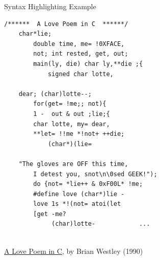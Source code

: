 \documentclass[10pt, xcolor={table}]{beamer}
\begin{document}
\begin{frame}[fragile]{Syntax Highlighting Example }
    \begin{center}
    \begin{minipage}[t]{0.5\textwidth}
    \begin{lstlisting}[basicstyle=\tiny]
    /******  A Love Poem in C  ******/
    char*lie;
        double time, me= !0XFACE,
        not; int rested, get, out;
        main(ly, die) char ly,**die ;{
            signed char lotte,
    
    dear; (char)lotte--;
        for(get= !me;; not){
        1 -  out & out ;lie;{
        char lotte, my= dear,
        **let= !!me *!not+ ++die;
            (char*)(lie=
        
    "The gloves are OFF this time,   
        I detest you, snot\n\0sed GEEK!");
        do {not= *lie++ & 0xF00L* !me;
        #define love (char*)lie -
        love 1s *!(not= atoi(let
        [get -me?
             (char)lotte-            ...
    \end{lstlisting}
    \end{minipage}
    \\\bigskip
    \href{http://www.ioccc.org/1990/westley.c}{A Love Poem in C}, by Brian Westley (1990)
    \end{center}
\end{frame}
\end{document}
